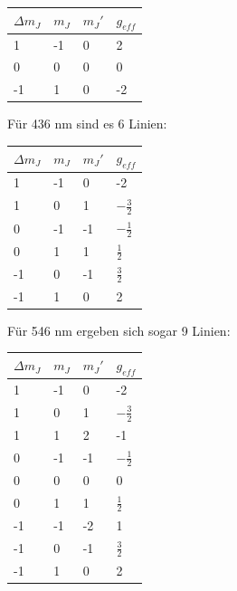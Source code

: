\documentclass[bigchapter,colorback,accentcolor=tud4b,linedtoc,11pt]{tudreport}
\begin{document}
\begin{center}
  \begin{tabular}{|p{2cm}|p{2cm}|p{2cm}|p{2cm}|}
    \hline
    $\Delta m_J$ & $m_J$ & $m_J'$ & $g_{eff}$ \\ \hline
    1               & -1               & 0 & 2 \\ \hline
    0               & 0                & 0 & 0 \\ \hline
    -1              & 1                & 0 & -2 \\ \hline
	\end{tabular}
\end{center}

Für 436 nm sind es 6 Linien:

\begin{center}
  \begin{tabular}{|p{2cm}|p{2cm}|p{2cm}|p{2cm}|}
    \hline
    $\Delta m_J$ & $m_J$ & $m_J'$ & $g_{eff}$ \\ \hline
    1               & -1               & 0 & -2 \\ \hline
    1               & 0                & 1 & $-\frac{3}{2}$ \\ \hline
    0               & -1               & -1 & $-\frac{1}{2}$ \\ \hline
    0               & 1                & 1 & $\frac{1}{2}$ \\ \hline
   -1               & 0                & -1 & $\frac{3}{2}$ \\ \hline    
   -1               & 1                & 0 & 2 \\ \hline
    \end{tabular}
\end{center}

Für 546 nm ergeben sich sogar 9 Linien:

\begin{center}
  \begin{tabular}{|p{2cm}|p{2cm}|p{2cm}|p{2cm}|}
    \hline
    $\Delta m_J$ & $m_J$ & $m_J'$ & $g_{eff}$ \\ \hline
    1               & -1               & 0 & -2 \\ \hline
    1               & 0                & 1 & $-\frac{3}{2}$ \\ \hline
    1               & 1                & 2 & -1 \\ \hline
    0               & -1               & -1 & $-\frac{1}{2}$ \\ \hline
    0               & 0                & 0 & 0 \\ \hline
    0               & 1                & 1 & $\frac{1}{2}$ \\ \hline
    -1              & -1               & -2 & 1 \\ \hline
    -1              & 0                & -1 & $\frac{3}{2}$ \\ \hline
    -1              & 1                & 0 & 2 \\ \hline
    \end{tabular}
\end{center}
\end{document}
